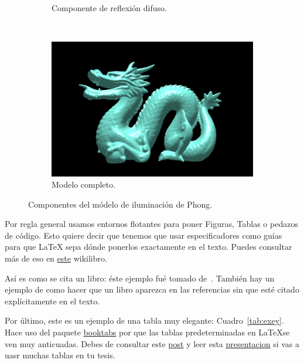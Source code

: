 \begin{figure}[htp]
\begin{subfigure}[b]{0.45\textwidth}
   \caption{Componente de reflexión difuso.}
   \label{fig:2c}
 \end{subfigure}
~
 \begin{subfigure}[b]{0.45\textwidth}
   \includegraphics[width=\textwidth]{img/02/completo}
   \caption{Modelo completo.}
   \label{fig:2d}
 \end{subfigure}
 \caption[Módelo de iluminación de Phong]{Componentes del módelo de iluminación de Phong.}
 \label{fig:two}
\end{figure}

Por regla general usamos entornos flotantes para poner Figuras, Tablas o pedazos de código.
Esto quiere decir que tenemos que usar especificadores como guías para que \LaTeX{} sepa dónde ponerlos exactamente en el texto.
Puedes consultar más de eso en \href{https://en.wikibooks.org/wiki/LaTeX/Floats,_Figures_and_Captions}{este} wikilibro.

Así es como se cita un libro: éste ejemplo fué tomado de~\cite{Gonzalez:ImagenesDigitales}.
También hay un ejemplo de como hacer que un libro aparezca en las referencias sin que esté citado explícitamente en el texto.

Por último, este es un ejemplo de una tabla muy elegante: Cuadro~\ref{tab:exey}.
Hace uso del paquete \href{https://ctan.org/pkg/booktabs}{booktabs} por que las tablas predeterminadas en \LaTeX se ven muy anticuadas.
Debes de consultar este \href{https://jdhao.github.io/2019/08/27/latex_table_with_booktabs/}{post} y leer esta \href{https://people.inf.ethz.ch/markusp/teaching/guides/guide-tables.pdf}{presentacion} si vas a uasr muchas tablas en tu tesis.

